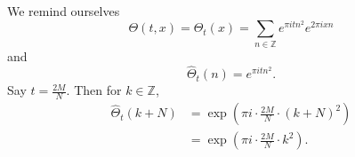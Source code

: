 \documentclass{article}
\theoremstyle{definition}
\begin{document}
We remind ourselves
\[
\Theta(t,x) =\Theta_t(x)=  \sum_{n \in \mathbb{Z}} e^{\pi itn^2} e^{2\pi ixn}
\]
and
\[
\widehat{\Theta}_t(n) = e^{\pi itn^2}.
\]
Say $t = \frac{2M}{N}$. Then for $k \in \mathbb{Z}$,
\begin{align*}
\widehat{\Theta}_t(k+N)&= \exp\left( \pi i \cdot \frac{2M}{N} \cdot (k+N)^2 \right)\\
&=\exp\left(\pi i \cdot \frac{2M}{N} \cdot k^2 \right).
\end{align*}
\end{document}
